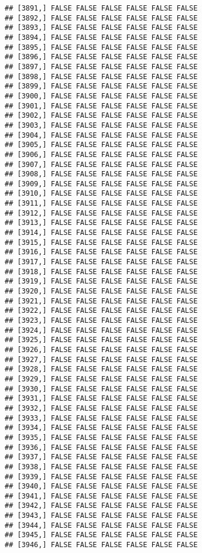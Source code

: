 \documentclass[
]{article}
\begin{document}
\begin{verbatim}
## [3891,] FALSE FALSE FALSE FALSE FALSE FALSE
## [3892,] FALSE FALSE FALSE FALSE FALSE FALSE
## [3893,] FALSE FALSE FALSE FALSE FALSE FALSE
## [3894,] FALSE FALSE FALSE FALSE FALSE FALSE
## [3895,] FALSE FALSE FALSE FALSE FALSE FALSE
## [3896,] FALSE FALSE FALSE FALSE FALSE FALSE
## [3897,] FALSE FALSE FALSE FALSE FALSE FALSE
## [3898,] FALSE FALSE FALSE FALSE FALSE FALSE
## [3899,] FALSE FALSE FALSE FALSE FALSE FALSE
## [3900,] FALSE FALSE FALSE FALSE FALSE FALSE
## [3901,] FALSE FALSE FALSE FALSE FALSE FALSE
## [3902,] FALSE FALSE FALSE FALSE FALSE FALSE
## [3903,] FALSE FALSE FALSE FALSE FALSE FALSE
## [3904,] FALSE FALSE FALSE FALSE FALSE FALSE
## [3905,] FALSE FALSE FALSE FALSE FALSE FALSE
## [3906,] FALSE FALSE FALSE FALSE FALSE FALSE
## [3907,] FALSE FALSE FALSE FALSE FALSE FALSE
## [3908,] FALSE FALSE FALSE FALSE FALSE FALSE
## [3909,] FALSE FALSE FALSE FALSE FALSE FALSE
## [3910,] FALSE FALSE FALSE FALSE FALSE FALSE
## [3911,] FALSE FALSE FALSE FALSE FALSE FALSE
## [3912,] FALSE FALSE FALSE FALSE FALSE FALSE
## [3913,] FALSE FALSE FALSE FALSE FALSE FALSE
## [3914,] FALSE FALSE FALSE FALSE FALSE FALSE
## [3915,] FALSE FALSE FALSE FALSE FALSE FALSE
## [3916,] FALSE FALSE FALSE FALSE FALSE FALSE
## [3917,] FALSE FALSE FALSE FALSE FALSE FALSE
## [3918,] FALSE FALSE FALSE FALSE FALSE FALSE
## [3919,] FALSE FALSE FALSE FALSE FALSE FALSE
## [3920,] FALSE FALSE FALSE FALSE FALSE FALSE
## [3921,] FALSE FALSE FALSE FALSE FALSE FALSE
## [3922,] FALSE FALSE FALSE FALSE FALSE FALSE
## [3923,] FALSE FALSE FALSE FALSE FALSE FALSE
## [3924,] FALSE FALSE FALSE FALSE FALSE FALSE
## [3925,] FALSE FALSE FALSE FALSE FALSE FALSE
## [3926,] FALSE FALSE FALSE FALSE FALSE FALSE
## [3927,] FALSE FALSE FALSE FALSE FALSE FALSE
## [3928,] FALSE FALSE FALSE FALSE FALSE FALSE
## [3929,] FALSE FALSE FALSE FALSE FALSE FALSE
## [3930,] FALSE FALSE FALSE FALSE FALSE FALSE
## [3931,] FALSE FALSE FALSE FALSE FALSE FALSE
## [3932,] FALSE FALSE FALSE FALSE FALSE FALSE
## [3933,] FALSE FALSE FALSE FALSE FALSE FALSE
## [3934,] FALSE FALSE FALSE FALSE FALSE FALSE
## [3935,] FALSE FALSE FALSE FALSE FALSE FALSE
## [3936,] FALSE FALSE FALSE FALSE FALSE FALSE
## [3937,] FALSE FALSE FALSE FALSE FALSE FALSE
## [3938,] FALSE FALSE FALSE FALSE FALSE FALSE
## [3939,] FALSE FALSE FALSE FALSE FALSE FALSE
## [3940,] FALSE FALSE FALSE FALSE FALSE FALSE
## [3941,] FALSE FALSE FALSE FALSE FALSE FALSE
## [3942,] FALSE FALSE FALSE FALSE FALSE FALSE
## [3943,] FALSE FALSE FALSE FALSE FALSE FALSE
## [3944,] FALSE FALSE FALSE FALSE FALSE FALSE
## [3945,] FALSE FALSE FALSE FALSE FALSE FALSE
## [3946,] FALSE FALSE FALSE FALSE FALSE FALSE

\end{verbatim}
\end{document}
